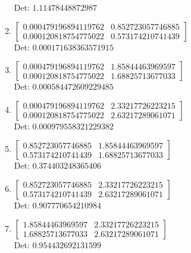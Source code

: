 \documentclass[12pt]{article}
\begin{document}
\begin{enumerate}
Det: $1.11478448872987$\\

\item $\displaystyle \left[\begin{matrix}0.000479196894119762 & 0.852723057746885\\0.000120818754775022 & 0.573174210741439\end{matrix}\right]$\\

Det: $0.000171638363571915$\\

\item $\displaystyle \left[\begin{matrix}0.000479196894119762 & 1.85844463969597\\0.000120818754775022 & 1.68825713677033\end{matrix}\right]$\\

Det: $0.000584472609229485$\\

\item $\displaystyle \left[\begin{matrix}0.000479196894119762 & 2.33217726223215\\0.000120818754775022 & 2.63217289061071\end{matrix}\right]$\\

Det: $0.000979558321229382$\\

\item $\displaystyle \left[\begin{matrix}0.852723057746885 & 1.85844463969597\\0.573174210741439 & 1.68825713677033\end{matrix}\right]$\\

Det: $0.374403248365406$\\

\item $\displaystyle \left[\begin{matrix}0.852723057746885 & 2.33217726223215\\0.573174210741439 & 2.63217289061071\end{matrix}\right]$\\

Det: $0.907770654210984$\\

\item $\displaystyle \left[\begin{matrix}1.85844463969597 & 2.33217726223215\\1.68825713677033 & 2.63217289061071\end{matrix}\right]$\\

Det: $0.954432692131599$\\

\end{enumerate}
\end{document}
